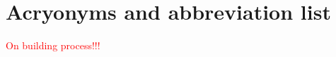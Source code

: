 \pagebreak
\section{Acryonyms and abbreviation list}
\par\vspace{0.5cm}

\begin{center}
  \textcolor{red}{\Large{On building process!!!}}
\end{center}


 
 
 
 
 
 
 
 
 
 
 
 
 
 
